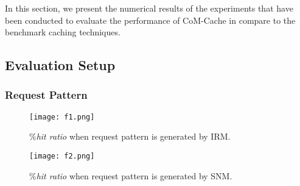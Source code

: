 \documentclass[journal,onecolumn]{IEEEtran}
\begin{document}
In this section, we present the numerical results of the experiments
that have been conducted to evaluate the performance of CoM-Cache in compare to the benchmark caching techniques.


\subsection{Evaluation Setup} 

\subsubsection{Request Pattern}


\begin{figure*}
\centering
\begin{minipage}[b]{.45\textwidth}
  \texttt{[image: f1.png]}
\caption{ \%\textit{hit ratio} when request pattern is generated by IRM.}\label{cache:fig2}
\end{minipage}\qquad
\begin{minipage}[b]{.45\textwidth}
  \texttt{[image: f2.png]}
\caption{ \%\textit{hit ratio} when request pattern is generated by SNM. }\label{cache:fig1}
\end{minipage}
\end{figure*} 
\end{document}
